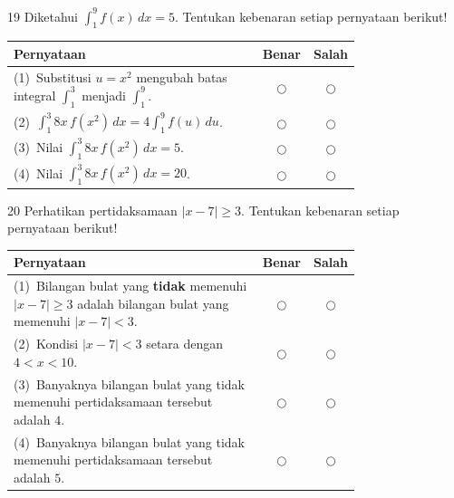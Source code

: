 \documentclass[11pt]{article}
\begin{document}
\begin{soal}{19}
Diketahui $\displaystyle\int_1^9 f(x)\,dx=5$.
Tentukan kebenaran setiap pernyataan berikut!

\par\smallskip
{\renewcommand{\arraystretch}{1.4}%
\begin{tabular}{@{}p{0.76\linewidth}cc@{}}
\hline
\textbf{Pernyataan} & \textbf{Benar} & \textbf{Salah}\\
\hline
(1)~Substitusi $u=x^2$ mengubah batas integral $\displaystyle\int_1^3$
    menjadi $\displaystyle\int_1^9$.
  & $\bigcirc$ & $\bigcirc$\\
(2)~$\displaystyle\int_1^3 8x\,f(x^2)\,dx = 4\int_1^9 f(u)\,du$.
  & $\bigcirc$ & $\bigcirc$\\
(3)~Nilai $\displaystyle\int_1^3 8x\,f(x^2)\,dx = 5$.
  & $\bigcirc$ & $\bigcirc$\\
(4)~Nilai $\displaystyle\int_1^3 8x\,f(x^2)\,dx = 20$.
  & $\bigcirc$ & $\bigcirc$\\
\hline
\end{tabular}}
\end{soal}

\begin{soal}{20}
Perhatikan pertidaksamaan $|x-7|\geq3$.
Tentukan kebenaran setiap pernyataan berikut!

\par\smallskip
{\renewcommand{\arraystretch}{1.4}%
\begin{tabular}{@{}p{0.76\linewidth}cc@{}}
\hline
\textbf{Pernyataan} & \textbf{Benar} & \textbf{Salah}\\
\hline
(1)~Bilangan bulat yang \textbf{tidak} memenuhi $|x-7|\geq3$
    adalah bilangan bulat yang memenuhi $|x-7|<3$.
  & $\bigcirc$ & $\bigcirc$\\
(2)~Kondisi $|x-7|<3$ setara dengan $4<x<10$.
  & $\bigcirc$ & $\bigcirc$\\
(3)~Banyaknya bilangan bulat yang tidak memenuhi pertidaksamaan tersebut
    adalah $4$.
  & $\bigcirc$ & $\bigcirc$\\
(4)~Banyaknya bilangan bulat yang tidak memenuhi pertidaksamaan tersebut
    adalah $5$.
  & $\bigcirc$ & $\bigcirc$\\
\hline
\end{tabular}}
\end{soal}

\end{document}
